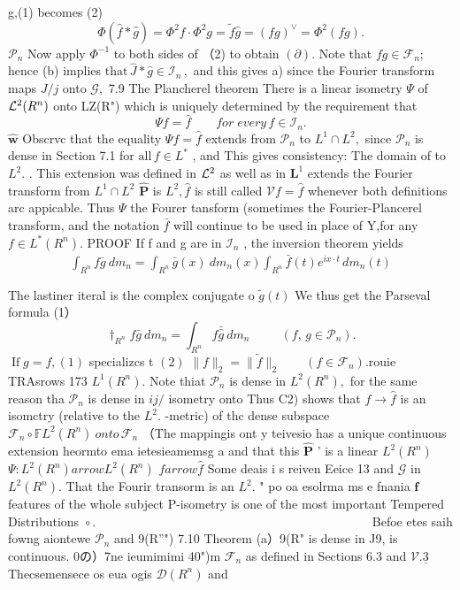 g,(1) becomes (2) $$ \Phi(\hat{f}*\hat{g})=\Phi^{2}f\cdot\Phi^{2}g=\tilde{f}\hat{g}=(f g)^{\vee}=\Phi^{2}(f g). $$ ${\mathcal{P}}_{n}$ Now apply $\Phi^{-1}$ to both sides of （2) to obtain $(\partial).$ Note that $f g\in{\mathcal{F}}_{n};$ hence (b) implies $\mathrm{that}\,\hat{J}\ast\hat{g}\in{\mathcal I}_{n}\,,$ and this gives a) since the Fourier transform maps $J/j$ onto ${\mathcal{G}},$ 7.9 The Plancherel theorem There is a linear isometry $\Psi$ of ${\cal L}^{2}(R^{n})$ onto LZ(R") which is uniquely determined by the requirement that $$ \Psi f=\hat{f}\qquad f o r\;e v e r y\,f\in{\mathcal I}_{n}. $$ $\mathbf{\hat{w}}$ Obscrvc that the equality $\Psi f={\hat{f}}$ extends from ${\mathcal{P}}_{n}$ to $L^{1}\cap L^{2},$ since ${\mathcal{P}}_{n}$ is dense in Section 7.1 for ${\mathrm{all}}\,f\in L^{*}$ , and This gives consistency: The domain of to $L^{2}.$ . This extension was defined in ${\cal L}^{2}$ as well as in ${\boldsymbol{L}}^{1}$ extends the Fourier transform from $L^{1}\cap L^{2}$ $\mathbf{\hat{P}}$ is $L^{2},{\hat{f}}$ is still called ${\mathcal{V}}f={\hat{f}}$ whenever both definitions arc appicable. Thus $\Psi$ the Fourer tansform (sometimes the Fourier-Plancerel transform, and the notation $\bar{f}$ will continue to be used in place of Y,for any $f\in L^{*}(R^{n}).$ PROOF If f and g are in ${\mathcal{I}}_{n}$ , the inversion theorem yields $$ \begin{array}{c}{{\int_{R^{n}}f\bar{g}\ d m_{n}=\int_{R^{n}}\bar{g}(x)\ d m_{n}(x)\int_{R^{n}}\bar{f}(t)e^{i x\cdot t}\,d m_{n}(t)}}\\ {{}}\\ {{}}\end{array} $$ The lastiner iteral is the complex conjugate o ${\tilde{g}}(t)$ We thus get the Parseval formula (1） $$ \dagger_{\scriptscriptstyle R^{n}}\!f\bar{g}\ d m_{n}=\int_{\scriptscriptstyle R^{n}}\!\!\!\!\!\!\!f\bar{\hat{g}}\ d m_{n}\;\;\;\;\;\;\;\;\;(f,\,g\in{\mathcal P}_{n}). $$ $\operatorname{If}g=f,(1)$ specializcs t $\left(2\right)$ $\|f\|_{2}=\|{\tilde{f}}\|_{2}\qquad(f\in{\mathcal{F}}_{n}).$rouie TRAsrows 173 $L^{1}(R^{n}).$ Note thiat ${\mathcal{P}}_{n}$ is dense in $L^{2}(R^{n}),$ for the same reason tha ${\mathcal{P}}_{n}$ is dense in ${i j}/$ isometry onto Thus C2) shows that $f\to{\hat{f}}$ is an isomctry (relative to the $L^{2}.$ -metric) of thc dense subspace ${\mathcal{F}}_{n}\circ\mathbb{F}L^{2}(R^{n})\ o n t o\,{\mathcal{F}}_{n}$ （The mappingis ont y teivesio has a unique continuous extension heormto ema ietesieamemsg a and that this $\mathbf{\hat{P}}$ ’ is a linear $L^{2}(R^{n})$ $\Psi\!:L^{2}(R^{n}) arrow L^{2}(R^{n})$ $f arrow{\hat{f}}$ Some deais i s reiven Eeice 13 and $\mathcal{G}$ in $L^{2}(R^{n}).$ That the Fourir transorm is an $L^{2}.$ " po oa esolrma ms e fnania $\boldsymbol{f}$ features of the whole subject P-isometry is one of the most important Tempered Distributions $\left.\right.\circ .\qquad\qquad\qquad\qquad\qquad\qquad\qquad\qquad\qquad\qquad\qquad$ Befoe etes saih fowng aiontewe ${\mathcal{P}}_{n}$ and 9(R”") 7.10 Theorem (a）9(R" is dense in J9, is continuous. 0の）7ne ieumimimi 40")m ${\mathcal{F}}_{n}$ as defined in Sections 6.3 and ${\mathcal{V}}.{\underline{{3}}}$ Thecsemensece os eua ogis ${\mathcal{D}}(R^{n})$ and 